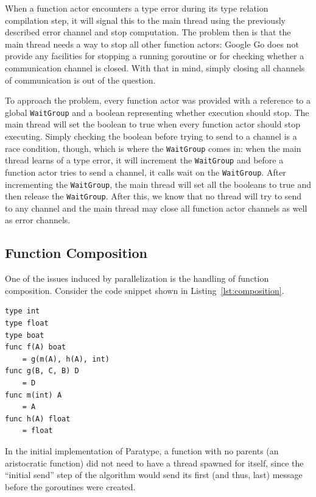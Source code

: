 \documentclass{acm_proc_article-sp}
\begin{document}
		When a function actor encounters a type error during its type relation
		compilation step, it will signal this to the main thread using the
		previously described error channel and stop computation. The problem
		then is that the main thread needs a way to stop all other function
		actors: Google Go does not provide any facilities for stopping a
		running goroutine or for checking whether a communication channel is
		closed. With that in mind, simply closing all channels of communication
		is out of the question.

		To approach the problem, every function actor was provided with a
		reference to a global \texttt{WaitGroup} and a boolean representing
		whether execution should stop. The main thread will set the boolean to
		true when every function actor should stop executing. Simply checking
		the boolean before trying to send to a channel is a race condition,
		though, which is where the \texttt{WaitGroup} comes in: when the main
		thread learns of a type error, it will increment the \texttt{WaitGroup}
		and before a function actor tries to send a channel, it calls wait on
		the \texttt{WaitGroup}. After incrementing the \texttt{WaitGroup}, the
		main thread will set all the booleans to true and then release the
		\texttt{WaitGroup}. After this, we know that no thread will try to send
		to any channel and the main thread may close all function actor
		channels as well as error channels.

	\subsection{Function Composition}
		\label{subsec:funccomp}

		One of the issues induced by parallelization is the handling of
		function composition. Consider the code snippet shown in 
		Listing~\ref{lst:composition}.

		\begin{lstlisting}[caption=Small Example of function composition,
		language=Paratype, label=lst:composition] 
type int
type float
type boat
func f(A) boat
	= g(m(A), h(A), int)
func g(B, C, B) D
	= D
func m(int) A
	= A
func h(A) float
	= float
		\end{lstlisting}

		In the initial implementation of Paratype, a function with no parents
		(an aristocratic function) did not need to have a thread spawned for
		itself, since the ``initial send'' step of the algorithm would send its
		first (and thus, last) message before the goroutines were created.
\end{document}
